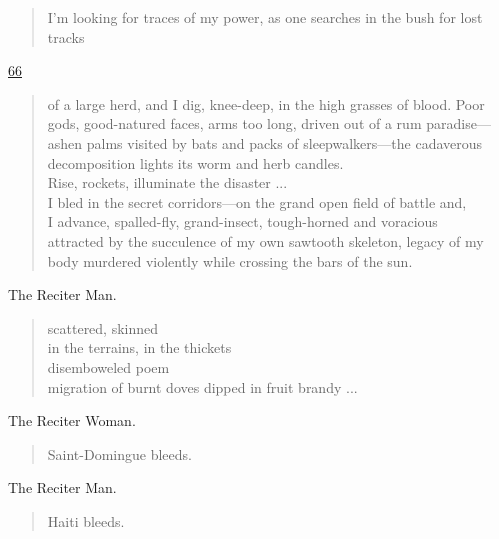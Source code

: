 \documentclass[letterpaper,article,12pt,oneside,notitlepage]{memoir}
\begin{document}
\begin{verse}
\indent I'm looking for traces of my power, as one searches in the bush for lost tracks \\
\end{verse}

\clearpage

\href{http://cesaire.elotroalex.com/chiens/chiens/p066.html}{66}

\begin{verse}
of a large herd, and I dig, knee-deep, in the high grasses of blood. Poor gods, good-natured faces, arms too long, driven out of a rum paradise---ashen palms visited by bats and packs of sleepwalkers---the cadaverous decomposition lights its worm and herb candles. \\
Rise, rockets, illuminate the disaster ... \\
I bled in the secret corridors---on the grand open field of battle and, \\
I advance, spalled-fly, grand-insect, tough-horned and voracious \\
attracted by the succulence of my own sawtooth skeleton, legacy of my body murdered violently while crossing the bars of the sun. \\
\end{verse}

\begin{center}The Reciter Man.\end{center}

\begin{verse}
scattered, skinned \\
in the terrains, in the thickets \\
disemboweled poem \\
migration of burnt doves dipped in fruit brandy ... \\
\end{verse}

\begin{center}The Reciter Woman.\end{center}

\begin{verse}
Saint-Domingue bleeds. \\
\end{verse}

\begin{center}The Reciter Man.\end{center}

\begin{verse}
Haiti bleeds. \\
\end{verse}
\end{document}
